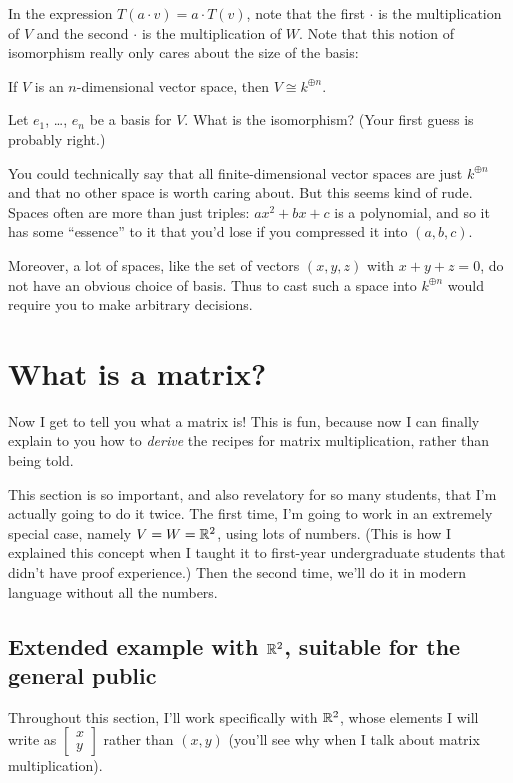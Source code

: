 In the expression $T(a \cdot v) = a \cdot T(v)$, note that the first $\cdot$ is the multiplication of $V$ and the second $\cdot$ is the multiplication of $W$.
Note that this notion of isomorphism really only cares about the size of the basis:
\begin{proposition}
	If $V$ is an $n$-dimensional vector space, then
	$V \cong k^{\oplus n}$.
\end{proposition}
\begin{ques}
	Let $e_1$, \dots, $e_n$ be a basis for $V$.
	What is the isomorphism?
	(Your first guess is probably right.)
\end{ques}
\begin{remark}
	You could technically say that all finite-dimensional vector
	spaces are just $k^{\oplus n}$ and that no other space is worth
	caring about.
	But this seems kind of rude.
	Spaces often are more than just triples: $ax^2+bx+c$ is a polynomial,
	and so it has some ``essence'' to it that you'd lose if you
	compressed it into $(a,b,c)$.

	Moreover, a lot of spaces, like the set of vectors $(x,y,z)$ with $x+y+z=0$,
	do not have an obvious choice of basis.
	Thus to cast such a space into $k^{\oplus n}$
	would require you to make arbitrary decisions.
\label{rem:vector_spaces_have_essence}
\end{remark}

\section{What is a matrix?}
Now I get to tell you what a matrix is!
This is fun, because now I can finally explain to you how to \emph{derive}
the recipes for matrix multiplication, rather than being told.

This section is so important, and also revelatory for so many students,
that I'm actually going to do it twice.
The first time, I'm going to work in an extremely special case,
namely $V = W = \mathbb R^2$, using lots of numbers.
(This is how I explained this concept when I taught it to first-year
undergraduate students that didn't have proof experience.)
Then the second time, we'll do it in modern language without all the numbers.

\subsection{Extended example with $\mathbb R^2$, suitable for the general public}
Throughout this section, I'll work specifically with $\mathbb R^2$, whose elements
I will write as $\left[ \begin{smallmatrix} x \\ y \end{smallmatrix} \right]$ rather than $(x,y)$
(you'll see why when I talk about matrix multiplication).

